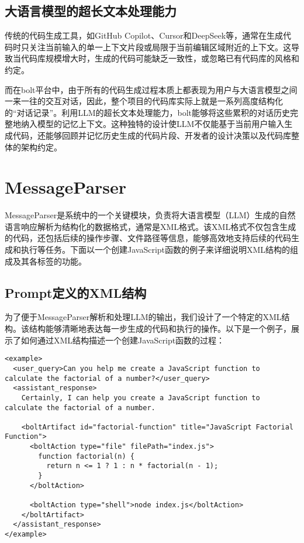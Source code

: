 \subsection{大语言模型的超长文本处理能力}

传统的代码生成工具，如GitHub Copilot、Cursor和DeepSeek等，通常在生成代码时只关注当前输入的单一上下文片段或局限于当前编辑区域附近的上下文。这导致当代码库规模增大时，生成的代码可能缺乏一致性，或忽略已有代码库的风格和约定。

而在bolt平台中，由于所有的代码生成过程本质上都表现为用户与大语言模型之间一来一往的交互对话，因此，整个项目的代码库实际上就是一系列高度结构化的“对话记录”。利用LLM的超长文本处理能力，bolt能够将这些累积的对话历史完整地纳入模型的记忆上下文。这种独特的设计使LLM不仅能基于当前用户输入生成代码，还能够回顾并记忆历史生成的代码片段、开发者的设计决策以及代码库整体的架构约定。

\section{MessageParser}

MessageParser是系统中的一个关键模块，负责将大语言模型（LLM）生成的自然语言响应解析为结构化的数据格式，通常是XML格式。该XML格式不仅包含生成的代码，还包括后续的操作步骤、文件路径等信息，能够高效地支持后续的代码生成和执行等任务。下面以一个创建JavaScript函数的例子来详细说明XML结构的组成及其各标签的功能。

\subsection{Prompt定义的XML结构}

为了便于MessageParser解析和处理LLM的输出，我们设计了一个特定的XML结构。该结构能够清晰地表达每一步生成的代码和执行的操作。以下是一个例子，展示了如何通过XML结构描述一个创建JavaScript函数的过程：

\begin{lstlisting}[breaklines=true,basicstyle=\ttfamily\small]
<example>
  <user_query>Can you help me create a JavaScript function to calculate the factorial of a number?</user_query>
  <assistant_response>
    Certainly, I can help you create a JavaScript function to calculate the factorial of a number.

    <boltArtifact id="factorial-function" title="JavaScript Factorial Function">
      <boltAction type="file" filePath="index.js">
        function factorial(n) {
          return n <= 1 ? 1 : n * factorial(n - 1);
        }
      </boltAction>

      <boltAction type="shell">node index.js</boltAction>
    </boltArtifact>
  </assistant_response>
</example>
\end{lstlisting}

